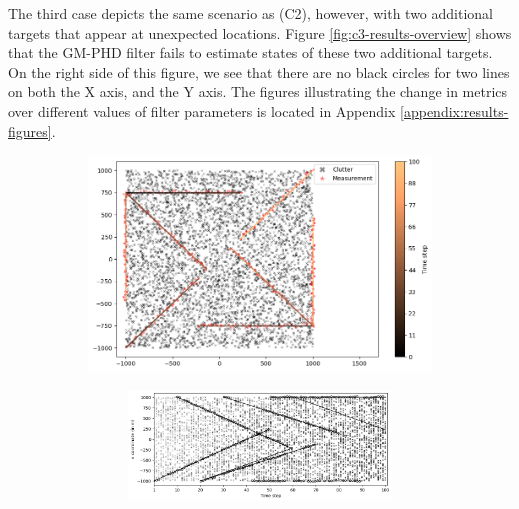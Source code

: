 
The third case depicts the same scenario as (C2), however, with two additional targets that appear at unexpected locations. Figure \ref{fig:c3-results-overview} shows that the GM-PHD filter fails to estimate states of these two additional targets. On the right side of this figure, we see that there are no black circles for two lines on both the X axis, and the Y axis. The figures illustrating the change in metrics over different values of filter parameters is located in Appendix \ref{appendix:results-figures}.

\begin{figure}
    \centering
    \begin{subfigure}[]{0.48\linewidth}
        \centering
        \includegraphics[width=\linewidth]{figures/c3-tracks-measurements.png}
    \end{subfigure}
    \hfill
    \begin{subfigure}[]{0.48\linewidth}
        \centering
        \begin{subfigure}[t]{\linewidth}
            \includegraphics[width=\linewidth]{figures/c3-x-estimates.png}
        \end{subfigure}

\end{subfigure}
\end{figure}

